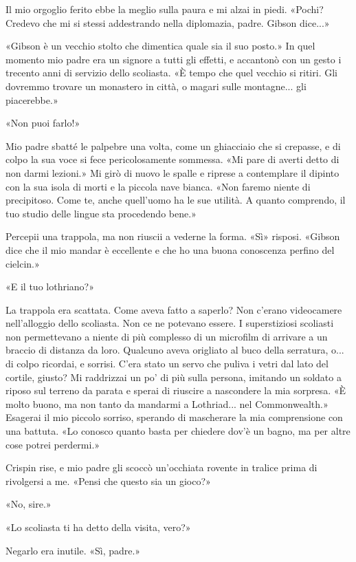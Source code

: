 Il mio orgoglio ferito ebbe la meglio sulla paura e mi alzai in piedi.
«Pochi? Credevo che mi si stessi addestrando nella diplomazia, padre.
Gibson dice...»

«Gibson è un vecchio stolto che dimentica quale sia il suo posto.» In
quel momento mio padre era un signore a tutti gli effetti, e accantonò
con un gesto i trecento anni di servizio dello scoliasta. «È tempo che
quel vecchio si ritiri. Gli dovremmo trovare un monastero in città, o
magari sulle montagne... gli piacerebbe.»

«Non puoi farlo!»

Mio padre sbatté le palpebre una volta, come un ghiacciaio che si
crepasse, e di colpo la sua voce si fece pericolosamente sommessa. «Mi
pare di averti detto di non darmi lezioni.» Mi girò di nuovo le spalle e
riprese a contemplare il dipinto con la sua isola di morti e la piccola
nave bianca. «Non faremo niente di precipitoso. Come te, anche
quell'uomo ha le sue utilità. A quanto comprendo, il tuo studio delle
lingue sta procedendo bene.»

Percepii una trappola, ma non riuscii a vederne la forma. «Sì» risposi.
«Gibson dice che il mio mandar è eccellente e che ho una buona
conoscenza perfino del cielcin.»

«E il tuo lothriano?»

La trappola era scattata. Come aveva fatto a saperlo? Non c'erano
videocamere nell'alloggio dello scoliasta. Non ce ne potevano essere. I
superstiziosi scoliasti non permettevano a niente di più complesso di un
microfilm di arrivare a un braccio di distanza da loro. Qualcuno aveva
origliato al buco della serratura, o... di colpo ricordai, e sorrisi.
C'era stato un servo che puliva i vetri dal lato del cortile, giusto? Mi
raddrizzai un po' di più sulla persona, imitando un soldato a riposo sul
terreno da parata e sperai di riuscire a nascondere la mia sorpresa. «È
molto buono, ma non tanto da mandarmi a Lothriad... nel Commonwealth.»
Esagerai il mio piccolo sorriso, sperando di mascherare la mia
comprensione con una battuta. «Lo conosco quanto basta per chiedere
dov'è un bagno, ma per altre cose potrei perdermi.»

Crispin rise, e mio padre gli scoccò un'occhiata rovente in tralice
prima di rivolgersi a me. «Pensi che questo sia un gioco?»

«No, sire.»

«Lo scoliasta ti ha detto della visita, vero?»

Negarlo era inutile. «Sì, padre.»

